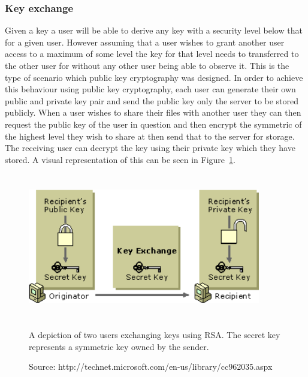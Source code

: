 \documentclass[12pt, titlepage]{article}
\begin{document}
\subsubsection{Key exchange}
Given a key a user will be able to derive any key with a security level below that for a given user. However assuming that a user wishes to grant another user access to a maximum of some level the key for that level needs to transferred to the other user for without any other user being able to observe it. This is the type of scenario which public key cryptography was designed. In order to achieve this behaviour using public key cryptography, each user can generate their own public and private key pair and send the public key only the server to be stored publicly. When a user wishes to share their files with another user they can then request the public key of the user in question and then encrypt the symmetric of the highest level they wish to share at then send that to the server for storage. The receiving user can decrypt the key using their private key which they have stored.
\newline \indent A visual representation of this can be seen in Figure~\ref{fig:rsaKeyExchange}.

\begin{figure}
\centerline{\includegraphics[height=2.5in,width=4in,angle=0]{images/rsaKeyExchange.pdf}}
\caption[Caption for LOF]{A depiction of two users exchanging keys using RSA. The secret key represents a symmetric key owned by the sender.}
\label{fig:rsaKeyExchange}
 \caption*{Source: http://technet.microsoft.com/en-us/library/cc962035.aspx}
\end{figure}
\end{document}
